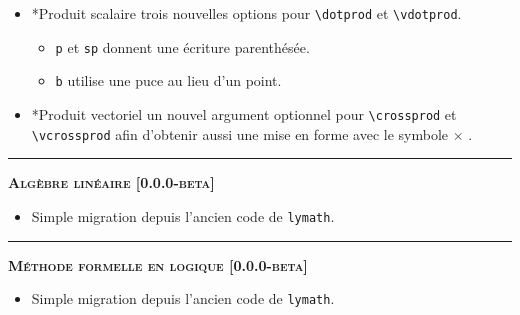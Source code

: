 \documentclass[12pt,a4paper]{book}
\makeatletter
\newcommand\env[1]{\texttt{#1}}
\newcommand\macro[1]{\env{\textbackslash{}#1}}
\theoremstyle{definition}
\newcommand\separation{
	\medskip
	\hfill\rule{0.5\textwidth}{0.75pt}\hfill
	\medskip
}
\newcommand\topic{\@ifstar{\@topic@star}{\@topic@no@star}}
\newcommand\@topic@no@star[1]{%
	\textbf{\textsc{#1}.}%
}
\newcommand\@topic@star[1]{%
	\textbf{\textsc{#1} :}%
}
\makeatother
\begin{document}
{{\begin{description}
    \begin{itemize}[itemsep=.5em]
        \item \topic*{Produit scalaire}
              trois nouvelles options pour \macro{dotprod} et \macro{vdotprod}.
        \begin{itemize}[itemsep=.5em]
            \item \verb+p+ et \verb+sp+ donnent une écriture parenthésée.
    
            \item \verb+b+ utilise une puce au lieu d'un point.
        \end{itemize}
    
    
    	
    
    
        \item \topic*{Produit vectoriel}
              un nouvel argument optionnel pour \macro{crossprod} et \macro{vcrossprod} afin d'obtenir aussi une mise en forme avec le symbole $\times$ .
    
    
        
    \end{itemize}
    
    
    \separation
    
    
    
    
    \begin{center}
        \textbf{\textsc{Algèbre linéaire [0.0.0-beta]}}
    \end{center}
    
    \begin{itemize}[itemsep=.5em]
        \item Simple migration depuis l'ancien code de \verb+lymath+.
    \end{itemize}
    
    
    \separation
    
    
    
    
    \begin{center}
        \textbf{\textsc{Méthode formelle en logique [0.0.0-beta]}}
    \end{center}
    
    \begin{itemize}[itemsep=.5em]
        \item Simple migration depuis l'ancien code de \verb+lymath+.
    \end{itemize}
    

\end{description}}}
\end{document}
